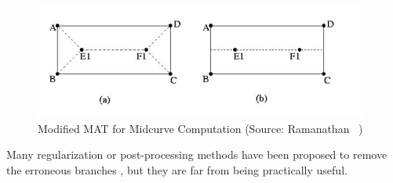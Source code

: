 	\begin{figure} [h]
		\centering
		\includegraphics[width=0.7\linewidth]{..//Common/images/midcurve}
		\caption{Modified MAT for Midcurve Computation (Source: Ramanathan~\cite{Ramanathan2004} )}
		\label{fig:litsurvey:midcurve}
	\end{figure}
	
Many regularization or post-processing methods have been proposed to remove the erroneous branches \cite{Attali2004,  Tam2003, Algazi1992,Brandt1992, Ogniewicz1995, Tam2002, Turkiyyah1995,Turkiyyah1997, KaoJune1999}, but they are far from being practically useful.






